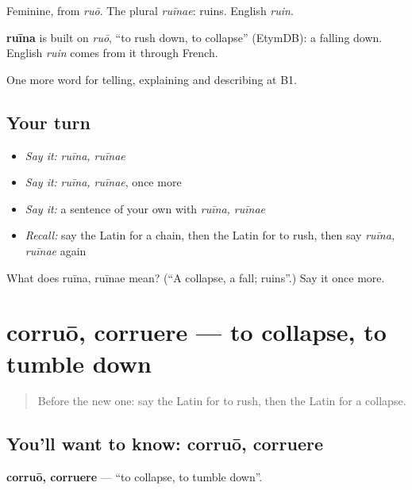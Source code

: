 Feminine, from \emph{ruō}. The plural \emph{ruīnae}: ruins. English \emph{ruin}.

\begin{cousinweb}
\textbf{ruīna} is built on \emph{ruō}, \textquotedblleft{}to rush down, to collapse\textquotedblright{} (EtymDB): a falling down. English \emph{ruin} comes from it through French.
\end{cousinweb}

\begin{grammarlens}[title={What you've built}]
One more word for telling, explaining and describing at B1.
\end{grammarlens}

\subsection*{Your turn}
\begin{itemize}
\raggedright
  \item \emph{Say it:} \emph{ruīna, ruīnae}
  \item \emph{Say it:} \emph{ruīna, ruīnae}, once more
  \item \emph{Say it:} a sentence of your own with \emph{ruīna, ruīnae}
  \item \emph{Recall:} say the Latin for a chain, then the Latin for to rush, then say \emph{ruīna, ruīnae} again
\end{itemize}

\begin{tcolorbox}[breakable,colback=teal!4,colframe=teal!35!black,title={Before you move on}]
What does ruīna, ruīnae mean? (\textquotedblleft{}A collapse, a fall; ruins\textquotedblright{}.) Say it once more.
\end{tcolorbox}
\section[corruō, corruere]{corruō, corruere — to collapse, to tumble down}

\label{lesson:LA-C313-corruo}



\begin{quote}
Before the new one: say the Latin for to rush, then the Latin for a collapse.
\end{quote}

\subsection*{You'll want to know: corruō, corruere}
\textbf{corruō, corruere} — \textquotedblleft{}to collapse, to tumble down\textquotedblright{}.

